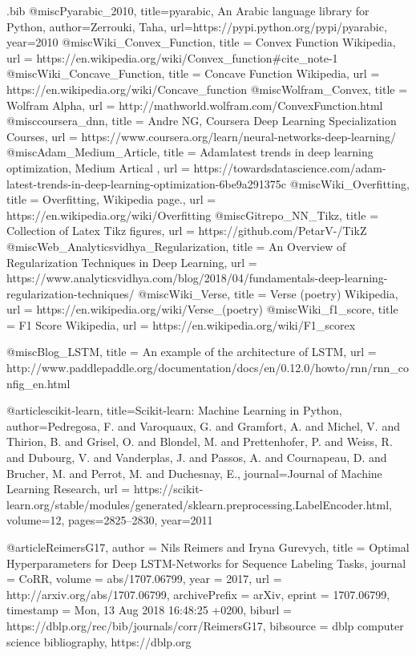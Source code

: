 \begin{filecontents}{\jobname.bib}
@misc{Pyarabic_2010,
  title={pyarabic, An Arabic language library for Python},
  author={Zerrouki, Taha},
  url={https://pypi.python.org/pypi/pyarabic},
  year={2010}
}
@misc{Wiki_Convex_Function,
  title =	 {Convex Function Wikipedia},
  url =		 {https://en.wikipedia.org/wiki/Convex\_function\#cite\_note-1}
}
@misc{Wiki_Concave_Function,
  title =	 {Concave Function Wikipedia},
  url =		 {https://en.wikipedia.org/wiki/Concave\_function}
}
@misc{Wolfram_Convex,
  title =	 {Wolfram Alpha},
  url =		 {http://mathworld.wolfram.com/ConvexFunction.html}
}
@misc{coursera_dnn,
  title =	 {Andre NG, Coursera Deep Learning Specialization Courses},
  url =		 {https://www.coursera.org/learn/neural-networks-deep-learning/}
}
@misc{Adam_Medium_Article,
  title =	 {Adam latest trends in deep learning optimization, Medium Artical },
  url =		 {https://towardsdatascience.com/adam-latest-trends-in-deep-learning-optimization-6be9a291375c}
}
@misc{Wiki_Overfitting,
  title =	 {Overfitting, Wikipedia page.},
  url =		 {https://en.wikipedia.org/wiki/Overfitting}
}
@misc{Gitrepo_NN_Tikz,
  title =	 {Collection of Latex Tikz figures},
  url =		 {https://github.com/PetarV-/TikZ}
}
@misc{Web_Analyticsvidhya_Regularization,
  title =	 {An Overview of Regularization Techniques in Deep Learning},
  url =		 {https://www.analyticsvidhya.com/blog/2018/04/fundamentals-deep-learning-regularization-techniques/}
}
@misc{Wiki_Verse,
  title =	 {Verse (poetry) Wikipedia},
  url =		 {https://en.wikipedia.org/wiki/Verse\_(poetry)}
}
@misc{Wiki_f1_score,
  title =	 {F1 Score Wikipedia},
  url =		 {https://en.wikipedia.org/wiki/F1\_scorex}
}

@misc{Blog_LSTM,
  title =	 {An example of the architecture of LSTM},
  url =		 {http://www.paddlepaddle.org/documentation/docs/en/0.12.0/howto/rnn/rnn_config_en.html}
}

@article{scikit-learn,
 title={Scikit-learn: Machine Learning in Python},
 author={Pedregosa, F. and Varoquaux, G. and Gramfort, A. and Michel, V.
         and Thirion, B. and Grisel, O. and Blondel, M. and Prettenhofer, P.
         and Weiss, R. and Dubourg, V. and Vanderplas, J. and Passos, A. and
         Cournapeau, D. and Brucher, M. and Perrot, M. and Duchesnay, E.},
 journal={Journal of Machine Learning Research},
 url = {https://scikit-learn.org/stable/modules/generated/sklearn.preprocessing.LabelEncoder.html},
 volume={12},
 pages={2825--2830},
 year={2011}
}

@article{ReimersG17,
  author    = {Nils Reimers and
               Iryna Gurevych},
  title     = {Optimal Hyperparameters for Deep LSTM-Networks for Sequence Labeling
               Tasks},
  journal   = {CoRR},
  volume    = {abs/1707.06799},
  year      = {2017},
  url       = {http://arxiv.org/abs/1707.06799},
  archivePrefix = {arXiv},
  eprint    = {1707.06799},
  timestamp = {Mon, 13 Aug 2018 16:48:25 +0200},
  biburl    = {https://dblp.org/rec/bib/journals/corr/ReimersG17},
  bibsource = {dblp computer science bibliography, https://dblp.org}
}



\end{filecontents}
